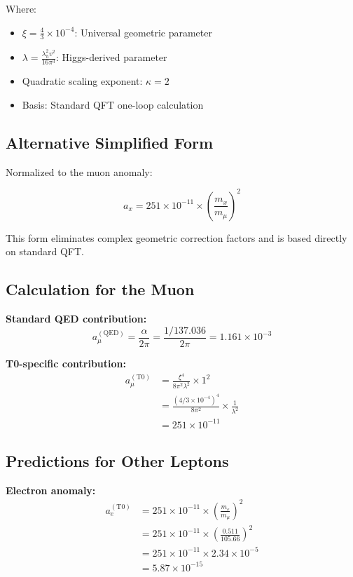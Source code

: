 \documentclass[12pt,a4paper]{article}
\begin{document}
	Where:
	\begin{itemize}
		\item $\xi = \frac{4}{3} \times 10^{-4}$: Universal geometric parameter
		\item $\lambda = \frac{\lambda_h^2 v^2}{16\pi^3}$: Higgs-derived parameter
		\item Quadratic scaling exponent: $\kappa = 2$
		\item Basis: Standard QFT one-loop calculation
	\end{itemize}
	
	\subsection{Alternative Simplified Form}
	
	Normalized to the muon anomaly:
	
	\begin{equation}
		\boxed{a_x = 251 \times 10^{-11} \times \left(\frac{m_x}{m_\mu}\right)^2}
	\end{equation}
	
	This form eliminates complex geometric correction factors and is based directly on standard QFT.
	
	\subsection{Calculation for the Muon}
	
	\textbf{Standard QED contribution:}
	\begin{equation}
		a_\mu^{(\text{QED})} = \frac{\alpha}{2\pi} = \frac{1/137.036}{2\pi} = 1.161 \times 10^{-3}
	\end{equation}
	
	\textbf{T0-specific contribution:}
	\begin{align}
		a_\mu^{(\text{T0})} &= \frac{\xi^4}{8\pi^2 \lambda^2} \times 1^2 \\
		&= \frac{(4/3 \times 10^{-4})^4}{8\pi^2} \times \frac{1}{\lambda^2} \\
		&= 251 \times 10^{-11}
	\end{align}
	
	\subsection{Predictions for Other Leptons}
	
	\textbf{Electron anomaly:}
	\begin{align}
		a_e^{(\text{T0})} &= 251 \times 10^{-11} \times \left(\frac{m_e}{m_\mu}\right)^2 \\
		&= 251 \times 10^{-11} \times \left(\frac{0.511}{105.66}\right)^2 \\
		&= 251 \times 10^{-11} \times 2.34 \times 10^{-5} \\
		&= 5.87 \times 10^{-15}
	\end{align}
	
\end{document}
